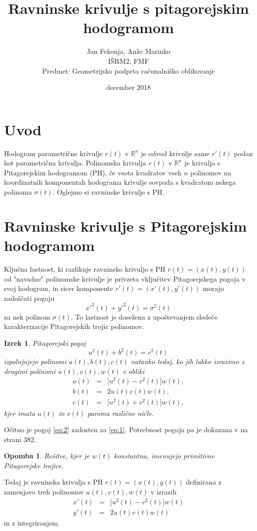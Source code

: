 \documentclass[a4paper]{article}
\title{Ravninske krivulje s pitagorejskim hodogramom}
\author{Jan Fekonja, Anže Marinko \\ IŠRM2, FMF \\ Predmet: Geometrijsko podprto računalniško oblikovanje}
\date{december 2018}
\newtheorem{theorem}{Izrek}
\newtheorem{remark}{Opomba}
\begin{document}
	\maketitle
	
	\section{Uvod}
	Hodogram parametrične krivulje $r (t)$ v $\mathbb{R}^n$ je odvod krivulje same $r\prime (t)$ podan kot parametrična krivulja. Polinomska krivulja $r (t)$ v $\mathbb{R}^n$ je krivulja s Pitagorejskim hodogramom (PH), če vsota kvadratov vseh $n$ polinomov na koordinatnih komponentah hodograma krivulje sovpada s kvadratom nekega polinoma $\sigma(t)$.
	Oglejmo si ravninske krivulje s PH.
	
	\section{Ravninske krivulje s Pitagorejskim hodogramom}
	Ključna lastnost, ki razlikuje ravninsko krivuljo s PH $r (t) = (x (t), y (t))$ od "navadne" polinomske krivulje je privzeta vključitev Pitagorejskega pogoja v svoj hodogram, in sicer komponente $r\prime (t) = (x\prime (t), y\prime (t))$ morajo zadoščati pogoju $$x\prime^2(t) + y\prime^2(t)= \sigma^2 (t)$$ za nek polinom $\sigma(t)$. To lastnost je dosežena z upoštevanjem sledeče karakterizacije Pitagorejskih trojic polinomov.
	\begin{theorem}
		Pitagorejski pogoj
		\begin{equation} \label{eq:1}
		a^2 (t) + b^2 (t) = c^2 (t)
		\end{equation}
		izpolnjujejo polinomi $a (t), b (t), c (t)$ natanko tedaj, ko jih lahko izrazimo z drugimi polinomi $u (t), v (t), w (t)$ v obliki
		\begin{eqnarray} \label{eq:2}
		a (t) &=& \lbrack u^2(t)-v^2(t)\rbrack w(t),\nonumber\\
		b(t) &=& 2u(t)v(t)w(t),\\
		c(t) &=& \lbrack u^2(t)+v^2(t)\rbrack w(t),\nonumber
		\end{eqnarray}
		kjer imata $u(t)$ in $v(t)$ paroma različne ničle.
	\end{theorem}
	\proof
	Očitno je pogoj \eqref{eq:2} zadosten za \eqref{eq:1}. Potrebnost pogoja pa je dokazana v \cite{knjiga} na strani 382.
	\endproof
	\begin{remark} 
		Rešitve, kjer je $w(t)$ konstantna, imenujejo primitivne Pitagorejske trojice.
	\end{remark}
	Tedaj je ravninska krivulja s PH $r (t) = (x (t), y (t))$ definirana z zamenjavo treh polinomov $u (t), v (t), w (t)$ v izrazih
	\begin{eqnarray}\label{eq:3}
	x\prime(t) &=& \lbrack u^2(t)-v^2(t)\rbrack w(t)\\
	y\prime(t)&=&2u(t)v(t)w(t)\nonumber
	\end{eqnarray}
	in z integriranjem.
	
\end{document}
